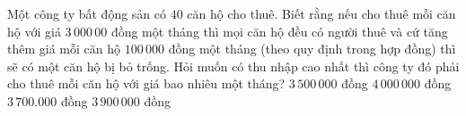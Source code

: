 \begin{vd}%
    Một công ty bất động sản có $40$ căn hộ cho thuê. Biết rằng nếu cho thuê mỗi căn hộ với giá $3\,000\,00$ đồng một tháng thì mọi căn hộ đều có người thuê và cứ tăng thêm giá mỗi căn hộ $100\,000$ đồng một tháng (theo quy định trong hợp đồng) thì sẽ có một căn hộ bị bỏ trống. Hỏi muốn có thu nhập cao nhất thì công ty đó phải cho thuê mỗi căn hộ với giá bao nhiêu một tháng?
    \choice
    {\True $3\,500\,000$ đồng}
    {$4\,000\,000$ đồng}
    {$3\,700.000$ đồng}
    {$3\,900\,000$ đồng}
\end{vd}
